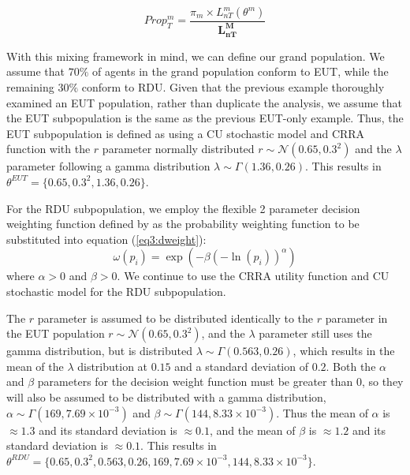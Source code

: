 \documentclass[../main.tex]{subfiles}
\begin{document}
\begin{equation}
	\label{eq3:Propm}
	\mathit{Prop^m_{T}} = \frac{\pi_m \times L_{nT}^m(\theta^m) }{\bm{L_{nT}^M}}
\end{equation}

With this mixing framework in mind, we can define our grand population.
We assume that $70\%$ of agents in the grand population conform to EUT, while the remaining $30\%$ conform to RDU.
Given that the previous example thoroughly examined an EUT population, rather than duplicate the analysis, we assume that the EUT subpopulation is the same as the previous EUT-only example.
Thus, the EUT subpopulation is defined as using a CU stochastic model and CRRA function with the $r$ parameter normally distributed $r \sim \mathcal{N}(0.65 , 0.3^2 )$ and the $\lambda$ parameter following a gamma distribution $\lambda \sim \Gamma(1.36 , 0.26)$.
This results in $\theta^{EUT} = \lbrace 0.65 ,0.3^2, 1.36 , 0.26\rbrace$.

For the RDU subpopulation, we employ the flexible 2 parameter decision weighting function defined by \textcite{Prelec1998} as the probability weighting function to be substituted into equation (\ref{eq3:dweight}):
\begin{equation}
	\label{eq3:pw:pre}
	\omega(p_i)=\exp(-\beta(-\ln(p_i))^\alpha)
\end{equation}
\noindent where $\alpha > 0$ and $\beta > 0$.
We continue to use the CRRA utility function and CU stochastic model for the RDU subpopulation.

The $r$ parameter is assumed to be distributed identically to the $r$ parameter in the EUT population $r \sim \mathcal{N}(0.65 , 0.3^2 )$, and the $\lambda$ parameter still uses the gamma distribution, but is distributed $\lambda \sim \Gamma(0.563 , 0.26)$, which results in the mean of the $\lambda$ distribution at $0.15$ and a standard deviation of $0.2$.{\footnotemark}
Both the $\alpha$ and $\beta$ parameters for the decision weight function must be greater than $0$, so they will also be assumed to be distributed with a gamma distribution, $\alpha \sim \Gamma(169 , 7.69 \times 10^{-3})$ and $\beta \sim \Gamma(144 , 8.33 \times 10^{-3})$.
Thus the mean of $\alpha$ is $\approx 1.3$ and its standard deviation is $\approx 0.1$, and the mean of $\beta$ is $\approx 1.2$ and its standard deviation is $\approx 0.1$.
This results in $\theta^{RDU} = \lbrace  0.65 ,0.3^2,  0.563 , 0.26 , 169 , 7.69 \times 10^{-3} , 144 , 8.33 \times 10^{-3} \rbrace$.

\addtocounter{footnote}{-1}
\end{document}
